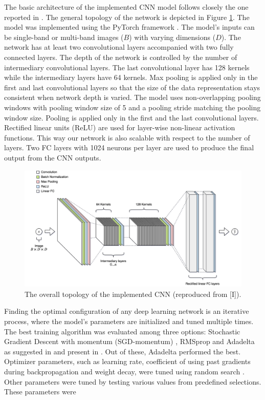 The basic architecture of the implemented CNN model follows closely the one reported in \cite{Krizhevsky2017a}. The general topology of the network is depicted in Figure \ref{fig:i-cnn}. The model was implemented using the PyTorch framework \cite{paszke2017automatic}. The model's inputs can be single-band or multi-band images ($B$) with varying dimensions ($D$). The network has at least two convolutional layers accompanied with two fully connected layers. The depth of the network is controlled by the number of intermediary convolutional layers. The last convolutional layer has 128 kernels while the intermediary layers have 64 kernels. Max pooling is applied only in the first and last convolutional layers so that the size of the data representation stays consistent when network depth is varied. The model uses non-overlapping pooling windows with pooling window size of 5 and a pooling stride matching the pooling window size. Pooling is applied only in the first and the last convolutional layers. Rectified linear units (ReLU) \cite{He2015} are used for layer-wise non-linear activation functions. This way our network is also scalable with respect to the number of layers. Two FC layers with 1024 neurons per layer are used to produce the final output from the CNN outputs.

\begin{figure}[ht]
\centering
\includegraphics[width = \textwidth]{images/i-cnn.png}
\caption{The overall topology of the implemented CNN (reproduced from [I]). }
\label{fig:i-cnn}
\end{figure}

Finding the optimal configuration of any deep learning network is an iterative process, where the model's parameters are initialized and tuned multiple times. The best training algorithm was evaluated among three options: Stochastic Gradient Descent with momentum (SGD-momentum) \cite{Bottou1998}, RMSprop \cite{Hinton2014} and Adadelta \cite{Zeiler2012} as suggested in \cite{Goodfellow-et-al-2016} and present in \cite{Karpathy2017}. Out of these, Adadelta performed the best. Optimizer parameters, such as learning rate, coefficient of using past gradients during backpropagation and weight decay, were tuned using random search \cite{Bergstra2012}. Other parameters were tuned by testing various values from predefined selections. These parameters were

